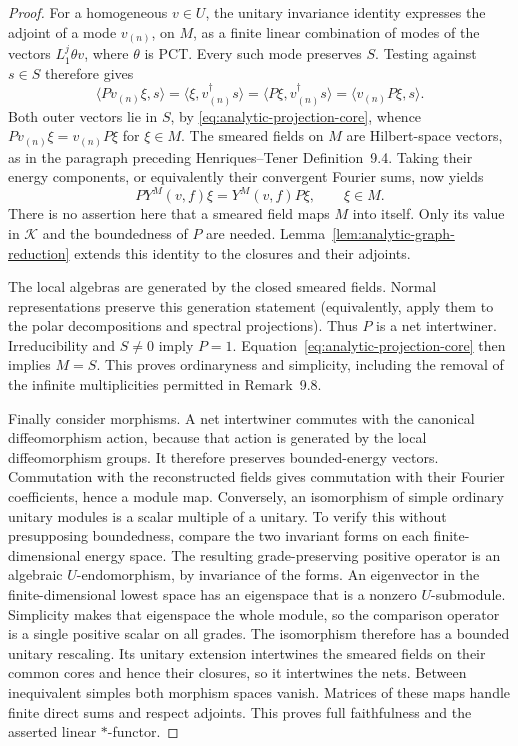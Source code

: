 \begin{proof}
For a homogeneous $v\in U$, the unitary invariance identity expresses
the adjoint of a mode $v_{(n)}$, on $M$, as a finite linear combination
of modes of the vectors $L_1^j\theta v$, where $\theta$ is PCT.
Every such mode preserves $S$.  Testing against $s\in S$ therefore
gives
\[
 \langle Pv_{(n)}\xi,s\rangle
 =\langle\xi,v_{(n)}^{\dagger}s\rangle
 =\langle P\xi,v_{(n)}^{\dagger}s\rangle
 =\langle v_{(n)}P\xi,s\rangle.
\]
Both outer vectors lie in $S$, by
\eqref{eq:analytic-projection-core}, whence
$Pv_{(n)}\xi=v_{(n)}P\xi$ for $\xi\in M$.
The smeared fields on $M$ are Hilbert-space vectors, as in the paragraph
preceding Henriques--Tener Definition~9.4.  Taking their energy
components, or equivalently their convergent Fourier sums, now yields
\[
 P Y^M(v,f)\xi=Y^M(v,f)P\xi,\qquad \xi\in M.
\]
There is no assertion here that a smeared field maps $M$ into itself.
Only its value in $\mathcal K$ and the boundedness of $P$ are needed.
Lemma~\ref{lem:analytic-graph-reduction} extends this identity to the
closures and their adjoints.

The local algebras are generated by the closed smeared fields.
Normal representations preserve this generation statement (equivalently,
apply them to the polar decompositions and spectral projections).
Thus $P$ is a net intertwiner.  Irreducibility and $S\ne0$ imply
$P=1$.  Equation~\eqref{eq:analytic-projection-core} then implies
$M=S$.  This proves ordinaryness and simplicity, including the removal
of the infinite multiplicities permitted in Remark~9.8.

Finally consider morphisms.  A net intertwiner commutes with the
canonical diffeomorphism action, because that action is generated by
the local diffeomorphism groups.  It therefore preserves bounded-energy
vectors.  Commutation with the reconstructed fields gives commutation
with their Fourier coefficients, hence a module map.  Conversely, an
isomorphism of simple ordinary unitary modules is a scalar multiple
of a unitary.  To verify this without presupposing boundedness, compare
the two invariant forms on each finite-dimensional energy space.  The
resulting grade-preserving positive operator is an algebraic
$U$-endomorphism, by invariance of the forms.  An eigenvector in the
finite-dimensional lowest space has an eigenspace that is a nonzero
$U$-submodule.  Simplicity makes that eigenspace the whole module, so
the comparison operator is a single positive scalar on all grades.
The isomorphism therefore has a bounded unitary rescaling.  Its
unitary extension intertwines the smeared fields on their common cores
and hence their closures, so it intertwines the nets.  Between
inequivalent simples both morphism spaces vanish.  Matrices of these
maps handle finite direct sums and respect adjoints.  This proves full
faithfulness and the asserted linear $*$-functor.
\end{proof}

